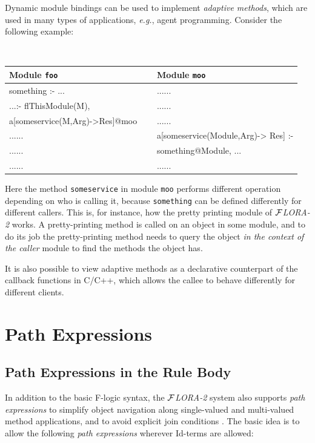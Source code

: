 \documentclass[11pt]{article}
\newcommand{\FLORA}{{\mbox{${\cal F}${\small\it LORA}\rm\emph{-2}}}\xspace}
\newcommand{\fl}{\mbox{F-logic}\xspace}
\begin{document}
Dynamic module bindings can be used to implement \emph{adaptive methods},
which are used in  many types of applications, {\it e.g.}, agent
programming. Consider the following example:
  \begin{center}
    {\tt
    \begin{tabular}{l l}
      Module {\tt foo}  & Module {\tt moo} \\
      \hline
      something :- ... & ......\\
      ...:- flThisModule(M), & ......\\
      \hspace*{1.5cm}a[someservice(M,Arg)->Res]@moo ~~& ......\\
      ...... & a[someservice(Module,Arg)-> Res] :- \\
      ...... & \hspace*{2.2cm} something@Module, ...\\
      ...... & ......
      
    \end{tabular}
    }
  \end{center}
  
  Here the method {\tt someservice} in module {\tt moo} performs different
  operation depending on who is calling it, because {\tt something} can be
  defined differently for different callers. This is, for instance, how the
  pretty printing module of \FLORA works. A pretty-printing method is
  called on an object in some module, and to do its job the pretty-printing
  method needs to query the object \emph{in the context of
    the caller} module to find the methods the object has.

It is also possible to view adaptive methods as a declarative counterpart
of the callback functions in C/C++, which allows the callee to behave
differently for different clients.


\section{Path Expressions}\label{sec-pathexpr}

\subsection{Path Expressions in the Rule Body}


 
In addition to the basic \fl syntax, the \FLORA  system also supports
\emph{path expressions} to simplify object navigation along
single-valued and multi-valued method applications, and to avoid
explicit join conditions \cite{frohn-lausen-uphoff-VLDB-94}.  The
basic idea is to allow the following \emph{path expressions} wherever
Id-terms are allowed:
\end{document}
